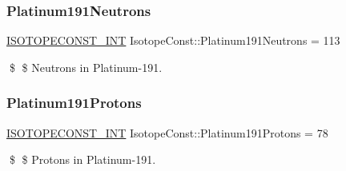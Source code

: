 \subsubsection{\texorpdfstring{Platinum191\+Neutrons}{Platinum191Neutrons}}
{\footnotesize\ttfamily \mbox{\hyperlink{group___isotope_const-_macros_ga5f18360b3e99483a35c32d789e62621c}{I\+S\+O\+T\+O\+P\+E\+C\+O\+N\+S\+T\+\_\+\+I\+NT}} Isotope\+Const\+::\+Platinum191\+Neutrons = 113}

\$ \$ Neutrons in Platinum-\/191. \mbox{\label{group___isotope_const-_platinum-_pt191_gabbe09cf6957714729edad15d8c605c04}} 
\subsubsection{\texorpdfstring{Platinum191\+Protons}{Platinum191Protons}}
{\footnotesize\ttfamily \mbox{\hyperlink{group___isotope_const-_macros_ga5f18360b3e99483a35c32d789e62621c}{I\+S\+O\+T\+O\+P\+E\+C\+O\+N\+S\+T\+\_\+\+I\+NT}} Isotope\+Const\+::\+Platinum191\+Protons = 78}

\$ \$ Protons in Platinum-\/191. 